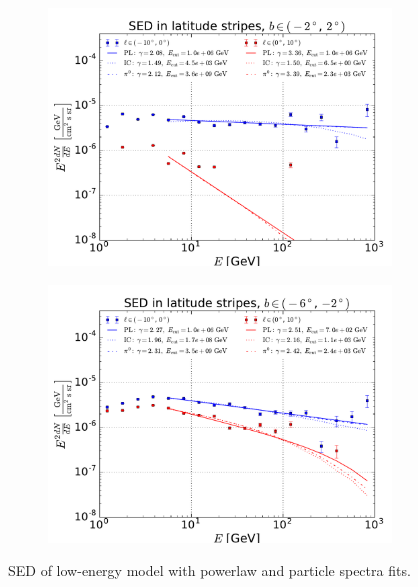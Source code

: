 \begin{figure}[h!]
    \begin{subfigure}{0.5\textwidth}
        \includegraphics[width=\textwidth]{plots/SED_lowE_source_0cutoff.pdf}
    \end{subfigure} 
    \begin{subfigure}{0.5\textwidth}
        \includegraphics[width=\textwidth]{plots/SED_lowE_source_-4cutoff.pdf}
    \end{subfigure}
  	\caption{SED of low-energy model with powerlaw and particle spectra fits.}
  	\label{fig:SED_with_fits}
\end{figure}




